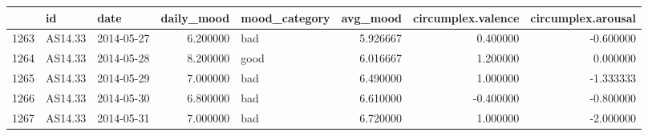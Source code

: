 \begin{tabular}{lllrlrrr}
\toprule
 & id & date & daily_mood & mood_category & avg_mood & circumplex.valence & circumplex.arousal \\
\midrule
1263 & AS14.33 & 2014-05-27 & 6.200000 & bad & 5.926667 & 0.400000 & -0.600000 \\
1264 & AS14.33 & 2014-05-28 & 8.200000 & good & 6.016667 & 1.200000 & 0.000000 \\
1265 & AS14.33 & 2014-05-29 & 7.000000 & bad & 6.490000 & 1.000000 & -1.333333 \\
1266 & AS14.33 & 2014-05-30 & 6.800000 & bad & 6.610000 & -0.400000 & -0.800000 \\
1267 & AS14.33 & 2014-05-31 & 7.000000 & bad & 6.720000 & 1.000000 & -2.000000 \\
\bottomrule
\end{tabular}

